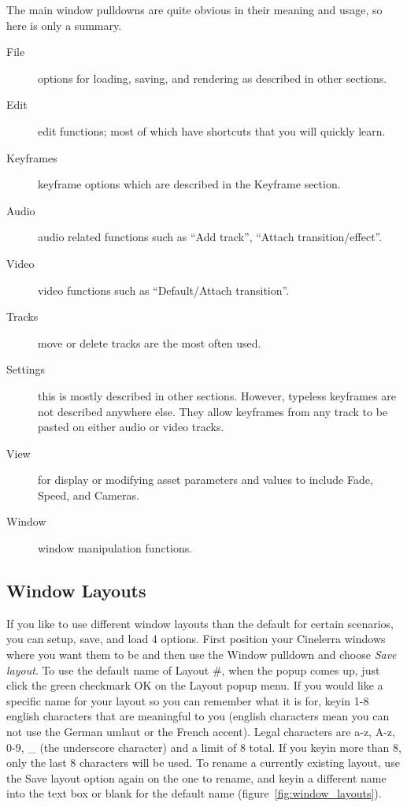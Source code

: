 The main window pulldowns are quite obvious in their meaning and usage, so here is only a summary.  


\begin{description}
    \item[File]  options for loading, saving, and rendering as described in other sections.
    \item[Edit]  edit functions; most of which have shortcuts that you will quickly learn.
    \item[Keyframes]  keyframe options which are described in the Keyframe section.
    \item[Audio]  audio related functions such as “Add track”, “Attach transition/effect”.
    \item[Video]  video functions such as “Default/Attach transition”.
    \item[Tracks]  move or delete tracks are the most often used.
    \item[Settings]  this is mostly described in other sections.  
        However, typeless keyframes are not described
        anywhere else.  
        They allow keyframes from any track to be pasted on either audio or video tracks.
    \item[View]  for display or modifying asset parameters and values to include Fade, Speed, and Cameras.
    \item[Window]  window manipulation functions.
\end{description}


\subsection{Window Layouts}%
\label{sub:window_layouts}

If you like to use different window layouts than the default for certain scenarios, you can setup, save, and load 4 options.   
First position your Cinelerra windows where you want them to be and then use the Window pulldown and choose \emph{Save layout}.  
To use the default name of Layout \#, when the popup comes up, just click the green checkmark OK on the Layout popup menu.  
If you would like a specific name for your layout so you can remember what it is for, keyin 1-8 english characters that are meaningful to you (english characters mean you can not use the German umlaut or the French accent).  
Legal characters are a-z, A-z, 0-9, \_ (the underscore character) and a limit of 8 total.  
If you keyin more than 8, only the last 8 characters will be used.  
To rename a currently existing layout, use the Save layout option again on the one to rename, and keyin a different name into the text box or blank for the default name (figure~\ref{fig:window_layouts}).

